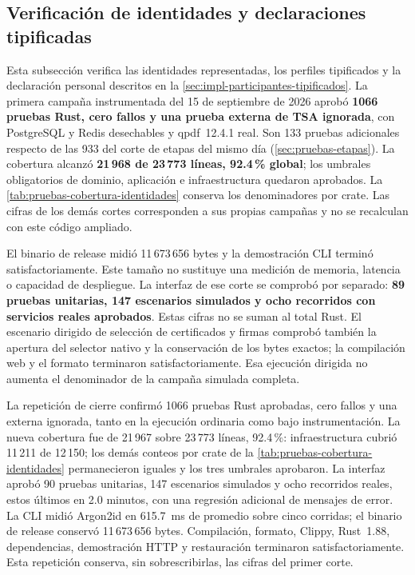 \subsection{Verificación de identidades y declaraciones tipificadas}\label{sec:pruebas-participantes-tipificados}

Esta subsección verifica las identidades representadas, los perfiles tipificados y la declaración personal descritos en la \cref{sec:impl-participantes-tipificados}. La primera campaña instrumentada del 15 de septiembre de 2026 aprobó \textbf{1066 pruebas Rust, cero fallos y una prueba externa de TSA ignorada}, con PostgreSQL y Redis desechables y qpdf~12.4.1 real. Son 133 pruebas adicionales respecto de las 933 del corte de etapas del mismo día (\cref{sec:pruebas-etapas}). La cobertura alcanzó \textbf{21\,968 de 23\,773 líneas, 92.4\,\% global}; los umbrales obligatorios de dominio, aplicación e infraestructura quedaron aprobados. La \cref{tab:pruebas-cobertura-identidades} conserva los denominadores por crate. Las cifras de los demás cortes corresponden a sus propias campañas y no se recalculan con este código ampliado.

El binario de release midió 11\,673\,656 bytes y la demostración CLI terminó satisfactoriamente. Este tamaño no sustituye una medición de memoria, latencia o capacidad de despliegue. La interfaz de ese corte se comprobó por separado: \textbf{89 pruebas unitarias, 147 escenarios simulados y ocho recorridos con servicios reales aprobados}. Estas cifras no se suman al total Rust. El escenario dirigido de selección de certificados y firmas comprobó también la apertura del selector nativo y la conservación de los bytes exactos; la compilación web y el formato terminaron satisfactoriamente. Esa ejecución dirigida no aumenta el denominador de la campaña simulada completa.

La repetición de cierre confirmó 1066 pruebas Rust aprobadas, cero fallos y una externa ignorada, tanto en la ejecución ordinaria como bajo instrumentación. La nueva cobertura fue de 21\,967 sobre 23\,773 líneas, 92.4\,\%: infraestructura cubrió 11\,211 de 12\,150; los demás conteos por crate de la \cref{tab:pruebas-cobertura-identidades} permanecieron iguales y los tres umbrales aprobaron. La interfaz aprobó 90 pruebas unitarias, 147 escenarios simulados y ocho recorridos reales, estos últimos en 2.0 minutos, con una regresión adicional de mensajes de error. La CLI midió Argon2id en 615.7~ms de promedio sobre cinco corridas; el binario de release conservó 11\,673\,656 bytes. Compilación, formato, Clippy, Rust~1.88, dependencias, demostración HTTP y restauración terminaron satisfactoriamente. Esta repetición conserva, sin sobrescribirlas, las cifras del primer corte.

